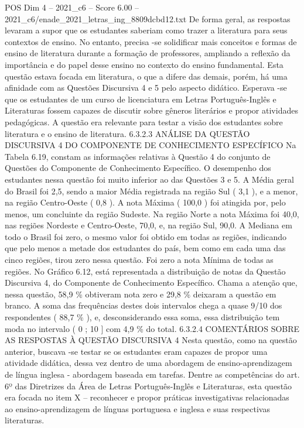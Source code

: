 \begin{textsample}{POS Dim 4 – 2021\_c6 – Score 6.00 – 2021\_c6/enade\_2021\_letras\_ing\_8809dcbd12.txt}
De forma geral, as respostas levaram a supor que os estudantes saberiam como trazer a literatura para seus contextos de ensino.
No entanto, precisa -se solidificar mais conceitos e formas de ensino de literatura durante a formação de professores, ampliando a reflexão da importância e do papel desse ensino no contexto do ensino fundamental.
Esta questão estava focada em literatura, o que a difere das demais, porém, há uma afinidade com as Questões Discursiva 4 e 5 pelo aspecto didático.
Esperava -se que os estudantes de um curso de licenciatura em Letras Português-Inglês e Literaturas fossem capazes de discutir sobre gêneros literários e propor atividades pedagógicas.
A questão era relevante para testar a visão dos estudantes sobre literatura e o ensino de literatura. 6.3.2.3 ANÁLISE DA QUESTÃO DISCURSIVA 4 DO COMPONENTE DE CONHECIMENTO ESPECÍFICO Na Tabela 6.19, constam as informações relativas à Questão 4 do conjunto de Questões do Componente de Conhecimento Específico.
O desempenho dos estudantes nessa questão foi muito inferior ao das Questões 3 e 5.
A Média geral do Brasil foi 2,5, sendo a maior Média registrada na região Sul ( 3,1 ), e a menor, na região Centro-Oeste ( 0,8 ).
A nota Máxima ( 100,0 ) foi atingida por, pelo menos, um concluinte da região Sudeste.
Na região Norte a nota Máxima foi 40,0, nas regiões Nordeste e Centro-Oeste, 70,0, e, na região Sul, 90,0.
A Mediana em todo o Brasil foi zero, o mesmo valor foi obtido em todas as regiões, indicando que pelo menos a metade dos estudantes do país, bem como em cada uma das cinco regiões, tirou zero nessa questão.
Foi zero a nota Mínima de todas as regiões.
No Gráfico 6.12, está representada a distribuição de notas da Questão Discursiva 4, do Componente de Conhecimento Específico.
Chama a atenção que, nessa questão, 58,9 \% obtiveram nota zero e 29,8 \% deixaram a questão em branco.
A soma das frequências destes dois intervalos chega a quase 9/10 dos respondentes ( 88,7 \% ), e, desconsiderando essa soma, essa distribuição tem moda no intervalo ( 0 ; 10 ] com 4,9 \% do total. 6.3.2.4 COMENTÁRIOS SOBRE AS RESPOSTAS À QUESTÃO DISCURSIVA 4 Nesta questão, como na questão anterior, buscava -se testar se os estudantes eram capazes de propor uma atividade didática, dessa vez dentro de uma abordagem de ensino-aprendizagem de língua inglesa - abordagem baseada em tarefas.
Dentre as competências do art. 6º das Diretrizes da Área de Letras Português-Inglês e Literaturas, esta questão era focada no item X – reconhecer e propor práticas investigativas relacionadas ao ensino-aprendizagem de línguas portuguesa e inglesa e suas respectivas literaturas.

\end{textsample}
